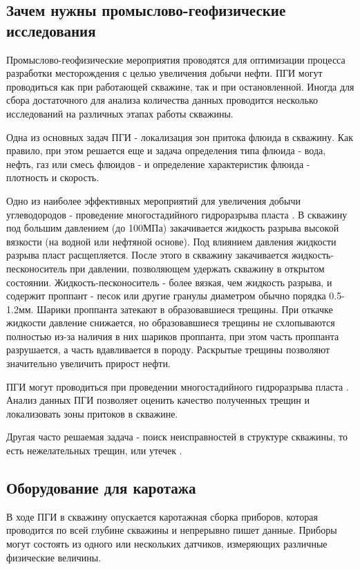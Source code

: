 \subsection{Зачем нужны промыслово-геофизические исследования}
\par
Промыслово-геофизические мероприятия проводятся для оптимизации процесса разработки месторождения с целью увеличения добычи нефти. ПГИ могут проводиться как при работающей скважине, так и при остановленной. Иногда для сбора достаточного для анализа количества данных проводится несколько исследований на различных этапах работы скважины.
\par
Одна из основных задач ПГИ - локализация зон притока флюида в скважину. Как правило, при этом решается еще и задача определения типа флюида - вода, нефть, газ или смесь флюидов - и определение характеристик флюида - плотность и скорость.
\par
Одно из наиболее эффективных мероприятий для увеличения добычи углеводородов - проведение многостадийного гидроразрыва пласта \cite{fracking}. В скважину под большим давлением (до 100МПа) закачивается жидкость разрыва высокой вязкости (на водной или нефтяной основе). Под влиянием давления жидкости разрыва пласт расщепляется. После этого в скважину закачивается жидкость-песконоситель при давлении, позволяющем удержать скважину в открытом состоянии. Жидкость-песконоситель - более вязкая, чем жидкость разрыва, и содержит проппант - песок или другие гранулы диаметром обычно порядка 0.5-1.2мм. Шарики проппанта затекают в образовавшиеся трещины. При откачке жидкости давление снижается, но образовавшиеся трещины не схлопываются полностью из-за наличия в них шариков проппанта, при этом часть проппанта разрушается, а часть вдавливается в породу. Раскрытые трещины позволяют значительно увеличить прирост нефти.

ПГИ могут проводиться при проведении многостадийного гидроразрыва пласта \cite{191562}. Анализ данных ПГИ позволяет оценить качество полученных трещин и локализовать зоны притоков в скважине.
\par
Другая часто решаемая задача - поиск неисправностей в структуре скважины, то есть нежелательных трещин, или утечек \cite{204557}.

\subsection{Оборудование для каротажа}
\par
В ходе ПГИ в скважину опускается каротажная сборка приборов, которая проводится по всей глубине скважины и непрерывно пишет данные. Приборы могут состоять из одного или нескольких датчиков, измеряющих различные физические величины.

